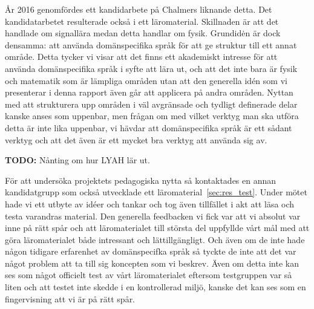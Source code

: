 \begin{draft}
År 2016 genomfördes ett kandidarbete på Chalmers liknande detta. \cite{kandidat2016}
Det kandidatarbetet resulterade också i ett läromaterial. Skillnaden är att det
handlade om signallära medan detta handlar om fysik. Grundidėn är dock densamma:
att använda domänspecifika språk för att ge struktur till ett annat område.
Detta tycker vi visar att det finns ett akademiskt intresse för att använda
domänspecifika språk i syfte att lära ut, och att det inte bara är fysik och
matematik som är lämpliga områden utan att den generella idén som vi presenterar
i denna rapport även går att applicera på andra områden. Nyttan med att
strukturera upp områden i väl avgränsade och tydligt definerade delar kanske
anses som uppenbar, men frågan om med vilket verktyg man ska utföra detta är
inte lika uppenbar, vi hävdar att domänspecifika språk är ett sådant verktyg och
att det även är ett mycket bra verktyg att använda sig av.

\textbf{TODO:} Nånting om hur LYAH lär ut.

För att undersöka projektets pedagogiska nytta så kontaktades en annan
kandidatgrupp som också utvecklade ett läromaterial~\ref{sec:res_test}. Under
mötet hade vi ett utbyte av idéer och tankar och tog även tillfället i akt att
läsa och testa varandras material. Den generella feedbacken vi fick var att vi
absolut var inne på rätt spår och att läromaterialet till största del uppfyllde
vårt mål med att göra läromaterialet både intressant och lättillgängligt. Och
även om de inte hade någon tidigare erfarenhet av domänspecifka språk så tyckte
de inte att det var något problem att ta till sig koncepten som vi beskrev. Även
om detta inte kan ses som något officielt test av vårt läromaterialet eftersom
testgruppen var så liten och att testet inte skedde i en kontrollerad miljö,
kanske det kan ses som en fingervisning att vi är på rätt spår.


\end{draft}
